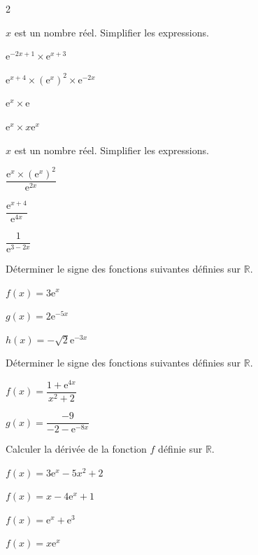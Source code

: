 \documentclass[11pt,a4paper]{article}  %
\begin{document}
\begin{multicols}{2}

$x$ est un nombre réel. Simplifier les expressions.
\begin{enumMet}
	\item $\mathrm{e}^{-2 x+1} \times \mathrm{e}^{x+3}$
	\item $\mathrm{e}^{x+4} \times\left(\mathrm{e}^x\right)^2 \times \mathrm{e}^{-2 x}$
	\item $\mathrm{e}^x \times \mathrm{e}$
	\item $\mathrm{e}^x \times x \mathrm{e}^x$
\end{enumMet}


$x$ est un nombre réel. Simplifier les expressions.
\begin{enumMet}
	\item $\dfrac{\mathrm{e}^x \times\left(\mathrm{e}^x\right)^2}{\mathrm{e}^{2 x}}$
	\item $\dfrac{\mathrm{e}^{x+4}}{\mathrm{e}^{4 x}}$
	\item $\dfrac{1}{\mathrm{e}^{3-2 x}}$
\end{enumMet}

\columnbreak


Déterminer le signe des fonctions suivantes définies sur $\mathbb{R}$.
\begin{enumMet}
	\item $f(x)=3 \mathrm{e}^x$
	\item $g(x)=2 \mathrm{e}^{-5 x}$
	\item $h(x)=-\sqrt{2} \mathrm{e}^{-3 x}$
\end{enumMet}


Déterminer le signe des fonctions suivantes définies sur $\mathbb{R}$.
\begin{enumMet}
	\item $f(x)=\dfrac{1+\mathrm{e}^{4 x}}{x^2+2}$
	\item $g(x)=\dfrac{-9}{-2-\mathrm{e}^{-8 x}}$
\end{enumMet}


Calculer la dérivée de la fonction $f$ définie sur $\mathbb{R}$.
\begin{enumMet}
	\item $f(x)=3 \mathrm{e}^x-5 x^2+2$
	\item $f(x)=x-4 \mathrm{e}^x+1$
	\item $f(x)=\mathrm{e}^x+\mathrm{e}^3$
	\item $f(x)=x \mathrm{e}^x$
\end{enumMet}
\end{multicols}
\end{document}
